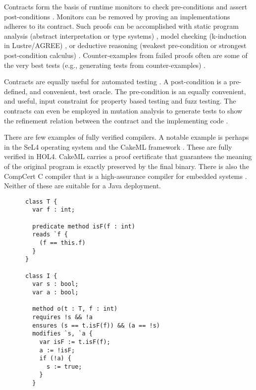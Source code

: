 \documentclass[11pt,onecolumn,notitlepage]{article}
\begin{document}
Contracts form the basis of runtime monitors to check pre-conditions and assert post-conditions \cite{10.1007/978-3-642-28869-2_11}. Monitors can be removed by proving an implementations adheres to its contract. Such proofs can be accomplished with static program analysis (abstract interpretation or type systems) \cite{10.1145/3158139}, model checking (k-induction in Lustre/AGREE) \cite{10.1007/978-3-642-23702-7_26,10.1007/978-3-319-96142-2_3, 10.1007/978-3-642-28891-3_13, 10.1007/3-540-48249-0_34, 10.1007/978-3-319-41540-6_29}, or deductive reasoning (weakest pre-condition or strongest post-condition calculus) \cite{10.1007/3-540-45314-8_21, Huisman2016, 10.1007/978-3-642-27705-4_7, DBLP:series/lncs/10001, 10.1007/978-3-030-03421-4_4}. Counter-examples from failed proofs often are some of the very best tests (e.g., generating tests from counter-examples) \cite{Billeter:Thesis:2008}.

Contracts are equally useful for automated testing \cite{10.1007/978-3-540-69507-3_9, Ciupa05automatictesting, 8471992, 8972014}. A post-condition is a pre-defined, and convenient, test oracle. The pre-condition is an equally convenient, and useful, input constraint for property based testing and fuzz testing. The contracts can even be employed in mutation analysis to generate tests to show the refinement relation between the contract and the implementing code \cite{KRENN200971}. 

There are few examples of fully verified compilers. A notable example is perhaps in the SeL4 operating system and the CakeML framework \cite{10.1145/1631687.1596566,ESOP18}. These are fully verified in HOL4. CakeML carries a proof certificate that guarantees the meaning of the original program is exactly preserved by the final binary. There is also the CompCert C compiler that is a high-assurance compiler for embedded systems \cite{Leroy-backend,2008-Leroy-Blazy-memory-model}. Neither of these are suitable for a Java deployment.

\newsavebox{\boxa}
\begin{lrbox}{\boxa}
    \begin{lstlisting}
      class T {
        var f : int;

        predicate method isF(f : int)
        reads `f {
          (f == this.f)
        }
      }
      
      class I {
        var s : bool;
        var a : bool;

        method o(t : T, f : int)
        requires !s && !a
        ensures (s == t.isF(f)) && (a == !s) 
        modifies `s, `a {
          var isF := t.isF(f);
          a := !isF;
          if (!a) {
            s := true;
          }
        }
    \end{lstlisting}
\end{lrbox}
\end{document}
